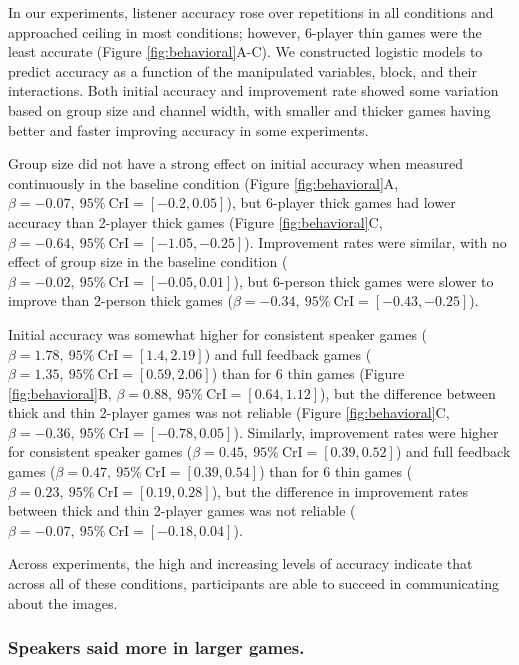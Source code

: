 \documentclass[
  english,
  a4paper,
]{article}
\begin{document}
In our experiments, listener accuracy rose over repetitions in all conditions and approached ceiling in most conditions; however, 6-player thin games were the least accurate (Figure \ref{fig:behavioral}A-C). We constructed logistic models to predict accuracy as a function of the manipulated variables, block, and their interactions. Both initial accuracy and improvement rate showed some variation based on group size and channel width, with smaller and thicker games having better and faster improving accuracy in some experiments.

Group size did not have a strong effect on initial accuracy when measured continuously in the baseline condition (Figure \ref{fig:behavioral}A, \(\beta=-0.07,\:95\%\:\mathrm{CrI}=[-0.2, 0.05]\)), but 6-player thick games had lower accuracy than 2-player thick games (Figure \ref{fig:behavioral}C, \(\beta=-0.64,\:95\%\:\mathrm{CrI}=[-1.05, -0.25]\)). Improvement rates were similar, with no effect of group size in the baseline condition (\(\beta=-0.02,\:95\%\:\mathrm{CrI}=[-0.05, 0.01]\)), but 6-person thick games were slower to improve than 2-person thick games (\(\beta=-0.34,\:95\%\:\mathrm{CrI}=[-0.43, -0.25]\)).

Initial accuracy was somewhat higher for consistent speaker games (\(\beta=1.78,\:95\%\:\mathrm{CrI}=[1.4, 2.19]\)) and full feedback games (\(\beta=1.35,\:95\%\:\mathrm{CrI}=[0.59, 2.06]\)) than for 6 thin games (Figure \ref{fig:behavioral}B, \(\beta=0.88,\:95\%\:\mathrm{CrI}=[0.64, 1.12]\)), but the difference between thick and thin 2-player games was not reliable (Figure \ref{fig:behavioral}C, \(\beta=-0.36,\:95\%\:\mathrm{CrI}=[-0.78, 0.05]\)). Similarly, improvement rates were higher for consistent speaker games (\(\beta=0.45,\:95\%\:\mathrm{CrI}=[0.39, 0.52]\)) and full feedback games (\(\beta=0.47,\:95\%\:\mathrm{CrI}=[0.39, 0.54]\)) than for 6 thin games ( \(\beta=0.23,\:95\%\:\mathrm{CrI}=[0.19, 0.28]\)), but the difference in improvement rates between thick and thin 2-player games was not reliable (\(\beta=-0.07,\:95\%\:\mathrm{CrI}=[-0.18, 0.04]\)).

Across experiments, the high and increasing levels of accuracy indicate that across all of these conditions, participants are able to succeed in communicating about the images.

\hypertarget{speakers-said-more-in-larger-games.}{%
\subsubsection{Speakers said more in larger games.}\label{speakers-said-more-in-larger-games.}}
\end{document}
